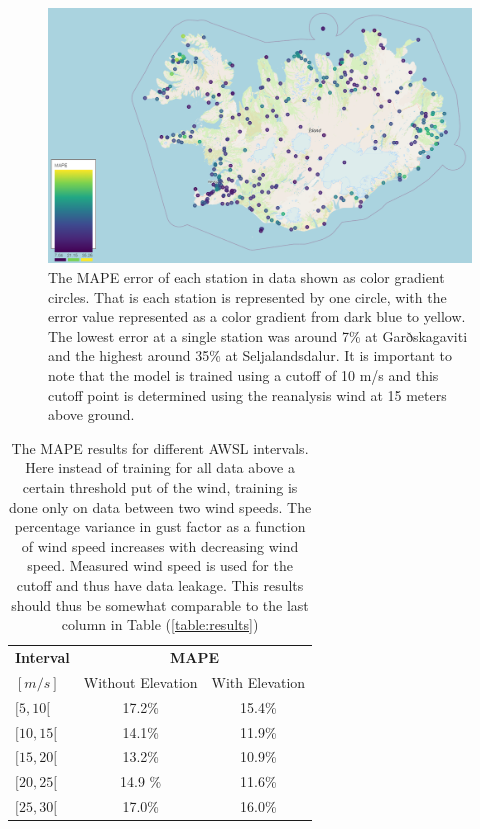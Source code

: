 \begin{figure}[h]
    \centering
    \includegraphics[scale = 0.5]{Figures/errorMap.png}
    \caption[MAPE error distribution of stations shown on a map of Iceland.]{The MAPE error of each station in data shown as color gradient circles. That is each station is represented by one circle, with the error value represented as a color gradient from dark blue to yellow. The lowest error at a single station was around 7\% at Garðskagaviti and the highest around 35\% at Seljalandsdalur. It is important to note that the model is trained using a cutoff of 10 m/s and this cutoff point is determined using the reanalysis wind at 15 meters above ground.}
    \label{fig:errorMap}
\end{figure}

\begin{table}[h]
    \caption[Model result looking at closed wind speed intervals]{The MAPE results for different AWSL intervals. Here instead of training for all data above a certain threshold put of the wind, training is done only on data between two wind speeds. The percentage variance in gust factor as a function of wind speed increases with decreasing wind speed. Measured wind speed is used for the cutoff and thus have data leakage. This results should thus be somewhat comparable to the last column in Table (\ref{table:results})}
    \label{table:closed_intervals}
    \centering
    \begin{tabular}{lcc}
        \toprule
        \textbf{Interval} &  \multicolumn{2}{c}{\textbf{MAPE}}\\
        $[m/s]$ & Without Elevation & With Elevation\\
        \midrule
        $[5, 10[$ & 17.2\% & 15.4\%\\ %
        $[10, 15[$ & 14.1\% & 11.9\%\\ %
        $[15, 20[$ & 13.2\% & 10.9\%\\ %
        $[20, 25[$ & 14.9 \% & 11.6\%\\ %
        $[25, 30[$ & 17.0\% & 16.0\%\\ %
        \bottomrule
    \end{tabular}
\end{table}

